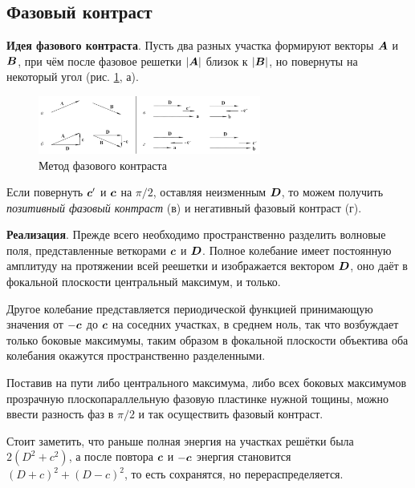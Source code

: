 \subsection{Фазовый контраст}







\textbf{Идея фазового контраста}. Пусть два разных участка формируют векторы $\mbox{\boldmath $A$}$ и $\mbox{\boldmath $B$}$, при чём после фазовое решетки $|\mbox{\boldmath $A$}|$ близок к $|\mbox{\boldmath $B$}|$, но повернуты на некоторый угол (рис. \ref{fig:pfc59}, а).
\begin{figure}[ht]
    \centering
    \includegraphics[width=0.65\textwidth]{figures/59_1.png}
    \caption{Метод фазового контраста}
    \label{fig:pfc59}
\end{figure}
Если повернуть $\mbox{\boldmath $c$}'$ и $\mbox{\boldmath $c$}$ на $\pi/2$, оставляя неизменным $\mbox{\boldmath $D$}$, то можем получить \textit{позитивный фазовый контраст} (в) и негативный фазовый контраст (г). 



\textbf{Реализация}. Прежде всего необходимо пространственно разделить волновые поля, представленные веткорами $\mbox{\boldmath $c$}$ и $\mbox{\boldmath $D$}$. Полное колебание имеет постоянную амплитуду на протяжении всей реешетки  и изображается вектором $\mbox{\boldmath $D$}$, оно даёт в фокальной плоскости центральный максимум, и только. 

Другое колебание представляется периодической функцией принимающую значения от $-\mbox{\boldmath $c$}$ до $\mbox{\boldmath $c$}$ на соседних участках, в среднем ноль, так что возбуждает только боковые максимумы, таким образом в фокальной плоскости объектива оба колебания окажутся пространственно разделенными. 

Поставив на пути либо центрального максимума, либо всех боковых максимумов прозрачную плоскопараллельную фазовую пластинке нужной тощины, можно ввести разность фаз в $\pi/2$ и так осуществить фазовый контраст. 


Стоит заметить, что раньше полная энергия на участках решётки была $2(D^2 + c^2)$, а после повтора $\mbox{\boldmath $c$}$ и $-\mbox{\boldmath $c$}$ энергия становится $(D+c)^2 + (D-c)^2$, то есть сохранятся, но перераспределяется. 





